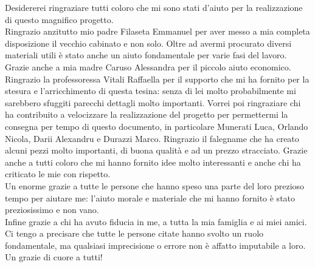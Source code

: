 \begin{thesisacknowledge}[italian]
Desidererei ringraziare tutti coloro che mi sono stati d’aiuto per la realizzazione di questo magnifico progetto.\\Ringrazio anzitutto mio padre Filaseta Emmanuel per aver messo a mia completa disposizione il vecchio cabinato e non solo. Oltre ad avermi procurato diversi materiali utili è stato anche un aiuto fondamentale per varie fasi del lavoro. Grazie anche a mia madre Caruso Alessandra per il piccolo aiuto economico.\\Ringrazio la professoressa Vitali Raffaella per il supporto che mi ha fornito per la stesura e l’arricchimento di questa tesina: senza di lei molto probabilmente mi sarebbero sfuggiti parecchi dettagli molto importanti. Vorrei poi ringraziare chi ha contribuito a velocizzare la realizzazione del progetto per permettermi la consegna per tempo di questo documento, in particolare Munerati Luca, Orlando Nicola, Darii Alexandru e Durazzi Marco. Ringrazio il falegname che ha creato alcuni pezzi molto importanti, di buona qualità e ad un prezzo stracciato. Grazie anche a tutti coloro che mi hanno fornito idee molto interessanti e anche chi ha criticato le mie con rispetto.\\
Un enorme grazie a tutte le persone che hanno speso una parte del loro prezioso tempo per aiutare me: l’aiuto morale e materiale che mi hanno fornito è stato preziosissimo e non vano.\\
Infine grazie a chi ha avuto fiducia in me, a tutta la mia famiglia e ai miei amici. Ci tengo a precisare che tutte le persone citate hanno svolto un ruolo fondamentale, ma qualsiasi imprecisione o errore non è affatto imputabile a loro.\\
Un grazie di cuore a tutti!
\end{thesisacknowledge}